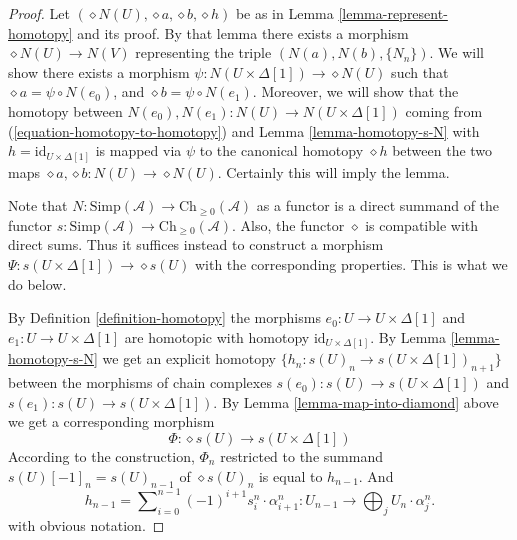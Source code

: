 \begin{proof}
Let $(\diamond N(U), \diamond a, \diamond b, \diamond h)$
be as in Lemma \ref{lemma-represent-homotopy} and its proof. By that lemma
there exists a morphism $\diamond N(U) \to N(V)$ representing
the triple $(N(a), N(b), \{N_n\})$. We will show
there exists a morphism
$\psi : N(U \times \Delta[1]) \to \diamond{N(U)}$
such that $\diamond a = \psi \circ N(e_0)$, and
$\diamond b = \psi \circ N(e_1)$. Moreover, we will
show that the homotopy between $N(e_0), N(e_1) :
N(U) \to N(U \times \Delta[1])$ coming from
(\ref{equation-homotopy-to-homotopy}) and
Lemma \ref{lemma-homotopy-s-N} with
$h = \text{id}_{U \times \Delta[1]}$ is mapped via
$\psi$ to the canonical homotopy $\diamond h$ between the two
maps $\diamond a, \diamond b : N(U) \to \diamond{N(U)}$. Certainly this
will imply the lemma.

\medskip\noindent
Note that $N : \text{Simp}(\mathcal{A}) \to \text{Ch}_{\geq 0}(\mathcal{A})$
as a functor is a direct summand of the functor
$s : \text{Simp}(\mathcal{A}) \to \text{Ch}_{\geq 0}(\mathcal{A})$.
Also, the functor $\diamond$ is compatible with direct sums.
Thus it suffices instead to construct a morphism
$\Psi : s(U \times \Delta[1]) \to \diamond{s(U)}$ with the
corresponding properties. This is what we do below.

\medskip\noindent
By Definition \ref{definition-homotopy}
the morphisms $e_0 : U \to U \times \Delta[1]$
and $e_1 : U \to U \times \Delta[1]$ are homotopic
with homotopy $\text{id}_{U \times \Delta[1]}$.
By Lemma \ref{lemma-homotopy-s-N}
we get an explicit homotopy
$\{h_n : s(U)_n \to s(U \times \Delta[1])_{n + 1}\}$
between the morphisms
of chain complexes $s(e_0) : s(U) \to s(U \times \Delta[1])$
and $s(e_1) : s(U) \to s(U \times \Delta[1])$. By
Lemma \ref{lemma-map-into-diamond} above we get a corresponding morphism
$$
\Phi : \diamond{s(U)} \to s(U \times \Delta[1])
$$
According to the construction, $\Phi_n$ restricted to the summand
$s(U)[-1]_n = s(U)_{n - 1}$ of $\diamond{s(U)}_n$
is equal to $h_{n - 1}$. And
$$
h_{n - 1} = \sum\nolimits_{i = 0}^{n - 1}
(-1)^{i + 1} s^n_i \cdot \alpha^n_{i + 1} :
U_{n - 1} \to \bigoplus\nolimits_j U_n \cdot \alpha^n_j.
$$
with obvious notation.


\end{proof}
